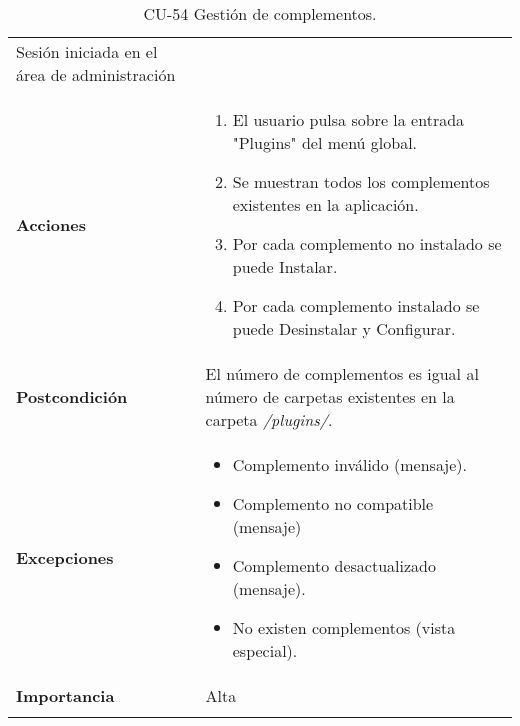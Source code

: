 \begin{longtable}[]{@{}ll@{}}
\begin{minipage}[t]{0.73\columnwidth}
Sesión iniciada en el área de administración\strut
\end{minipage}\tabularnewline
\begin{minipage}[t]{0.21\columnwidth}\raggedright
\textbf{Acciones}\strut
\end{minipage} & \begin{minipage}[t]{0.73\columnwidth}\raggedright
\begin{enumerate}
\def\labelenumi{\arabic{enumi}.}
\tightlist
\item
  El usuario pulsa sobre la entrada "Plugins" del menú global.
\item
  Se muestran todos los complementos existentes en la aplicación.
\item
  Por cada complemento no instalado se puede Instalar.
\item
  Por cada complemento instalado se puede Desinstalar y Configurar.
\end{enumerate}\strut
\end{minipage}\tabularnewline
\begin{minipage}[t]{0.21\columnwidth}\raggedright
\textbf{Postcondición}\strut
\end{minipage} & \begin{minipage}[t]{0.73\columnwidth}\raggedright
El número de complementos es igual al número de carpetas existentes en
la carpeta \emph{/plugins/}.\strut
\end{minipage}\tabularnewline
\begin{minipage}[t]{0.21\columnwidth}\raggedright
\textbf{Excepciones}\strut
\end{minipage} & \begin{minipage}[t]{0.73\columnwidth}\raggedright
\begin{itemize}
\tightlist
\item
  Complemento inválido (mensaje).
\item
  Complemento no compatible (mensaje)
\item
  Complemento desactualizado (mensaje).
\item
  No existen complementos (vista especial).
\end{itemize}\strut
\end{minipage}\tabularnewline
\begin{minipage}[t]{0.21\columnwidth}\raggedright
\textbf{Importancia}\strut
\end{minipage} & \begin{minipage}[t]{0.73\columnwidth}\raggedright
Alta\strut
\end{minipage}\tabularnewline
\bottomrule
\caption{CU-54 Gestión de complementos.}
\end{longtable}

